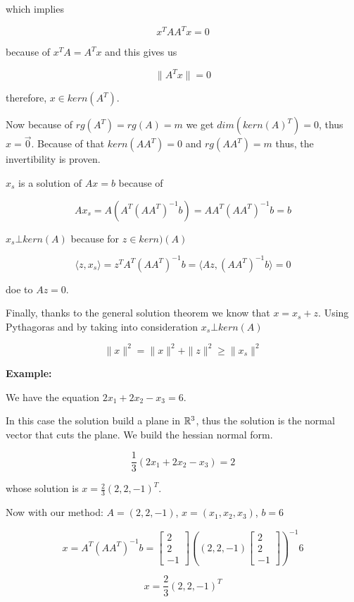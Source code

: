 which implies 

\[
	x^T AA^T x = 0
\] 

because of \(x^T A = A^T x\) and this gives us 

\[
	\|A^T x\| = 0
\] 

therefore, \(x \in kern(A^T)\).

Now because of \(rg(A^T) = rg(A) = m\) we get \(dim(kern(A)^T) = 0\), thus \(x = \vec{0}\). 
Because of that \(kern(A A^T) = 0\) and \(rg(AA^T) = m\) thus, the invertibility is proven.

\(x_s\) is a solution of \(Ax = b\) because of 

\[
	Ax_s = A(A^T {(A A^T)}^{-1} b) = AA^T {(A A^T)}^{-1} b = b
\]

\(x_s \bot kern(A)\) because for \(z \in kern)(A)\)

\[
	\langle z, x_s\rangle = z^T A^T {(A A^T)}^{-1} b = \langle Az, {(A A^T)}^{-1} b \rangle = 0
\]

doe to \(Az = 0\).

Finally, thanks to the general solution theorem we know that \(x = x_s + z\). Using Pythagoras and by 
taking into consideration \(x_s \bot kern(A)\)

\[
	\| x\|^2 = \|x\|^2 + \|z\|^2 \ge \|x_s\|^2
\]

\textbf{Example:}

We have the equation \(2x_1 + 2x_2 - x_3 = 6\).

In this case the solution build a plane in \(\mathbb{R}^3\), thus the solution is the normal vector that 
cuts the plane. We build the hessian normal form.

\[
	\frac{1}{3} (2x_1 + 2x_2 - x_3) = 2
\]

whose solution is \(x = \frac{2}{3}(2, 2, -1)^T\).

Now with our method: \(A = (2, 2, -1)\), \(x = (x_1, x_2, x_3)\), \(b = 6\)

\[
	x = A^T {(AA^T)}^{-1} b =
	\begin{bmatrix}
	2\\
	2\\
	-1
	\end{bmatrix}
	{\left(
		(2,2,-1)
	\begin{bmatrix}
	2\\
	2\\
	-1		
	\end{bmatrix}
	\right)}^{-1}
	6
\]

\[
	x = \frac{2}{3}(2, 2, -1)^T
\]


